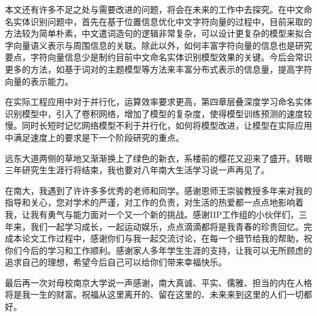 \documentclass[winfonts,master,oneside,nobackinfo]{njuthesis}
\begin{document}
本文还有许多不足之处与需要改进的问题，将会在未来的工作中去探究。在中文命名实体识别问题中，首先在基于位置信息优化中文字符向量的过程中，目前采取的方法较为简单朴素，中文遣词造句的逻辑非常复杂，可以设计更复杂的模型来拟合字向量语义表示与周围信息的关联。除此以外，如何丰富字符向量的信息也是研究要点，字符向量信息少是制约目前中文命名实体识别模型效果的关键。今后会常识更多的方法，如基于词对的主题模型等方法来丰富分布式表示的信息量，提高字符向量的表示能力。

在实际工程应用中对于并行化，运算效率要求更高，第四章层叠深度学习命名实体识别模型中，引入了卷积网络，增加了模型的复杂度，使得模型训练预测的速度较慢。同时长短时记忆网络模型不利于并行化，如何将模型改进，让模型在实际应用中满足速度上的要求是下一个阶段研究的重点。




\begin{acknowledgement}

远东大道两侧的草地又渐渐换上了绿色的新衣，系楼前的樱花又迎来了盛开。转眼三年研究生生涯行将结束，我也要对八年南大生活学习说一声再见了。

在南大，我遇到了许许多多优秀的老师和同学。感谢恩师王崇骏教授多年来对我的指导和关心，您对学术的严谨，对工作的负责，对生活的热爱都一点点地影响着我，让我有勇气与能力面对一个又一个新的挑战。感谢IIP工作组的小伙伴们，三年来，我们一起学习成长，一起运动娱乐，点点滴滴都将是我青春的珍贵回忆。完成本论文工作过程中，感谢你们与我一起交流讨论，在每一个细节给我的帮助，祝你们今后的学习和工作顺利。感谢家人多年学生生涯的支持，让我可以无所顾虑的追求自己的理想，希望今后自己可以给你们带来幸福快乐。

最后再一次对母校南京大学说一声感谢，南大真诚、平实、儒雅、担当的内在人格将是我一生的财富。祝福从这里离开的、留在这里的、未来来到这里的人们一切都好。

\end{acknowledgement}






\end{document}
